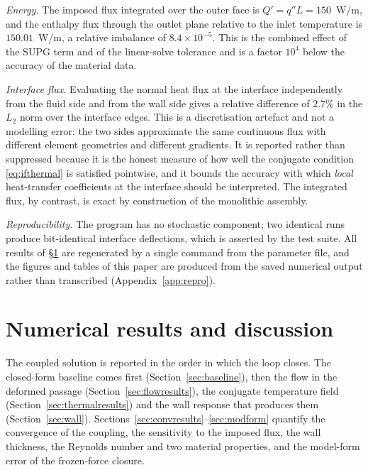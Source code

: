 \documentclass[11pt,a4paper]{article}
\begin{document}
\emph{Energy.} The imposed flux integrated over the outer face is
$Q'=q''L=150$~W/m, and the enthalpy flux through the outlet plane relative to
the inlet temperature is $150.01$~W/m, a relative imbalance of
$8.4\times10^{-5}$. This is the combined effect of the SUPG term and of the
linear-solve tolerance and is a factor $10^{4}$ below the accuracy of the
material data.

\emph{Interface flux.} Evaluating the normal heat flux at the interface
independently from the fluid side and from the wall side gives a relative
difference of $2.7\%$ in the $L_2$ norm over the interface edges. This is a
discretisation artefact and not a modelling error: the two sides approximate
the same continuous flux with different element geometries and different
gradients. It is reported rather than suppressed because it is the honest
measure of how well the conjugate condition \eqref{eq:ifthermal} is satisfied
pointwise, and it bounds the accuracy with which \emph{local} heat-transfer
coefficients at the interface should be interpreted. The integrated flux, by
contrast, is exact by construction of the monolithic assembly.

\emph{Reproducibility.} The program has no stochastic component; two identical
runs produce bit-identical interface deflections, which is asserted by the
test suite. All results of \S\ref{sec:results} are regenerated by a single
command from the parameter file, and the figures and tables of this paper are
produced from the saved numerical output rather than transcribed
(Appendix~\ref{app:repro}).


\section{Numerical results and discussion}
\label{sec:results}

The coupled solution is reported in the order in which the loop closes. The
closed-form baseline comes first (Section~\ref{sec:baseline}), then the flow in
the deformed passage (Section~\ref{sec:flowresults}), the conjugate temperature
field (Section~\ref{sec:thermalresults}) and the wall response that produces
them (Section~\ref{sec:wall}). Sections~\ref{sec:convresults}--\ref{sec:modform}
quantify the convergence of the coupling, the sensitivity to the imposed flux,
the wall thickness, the Reynolds number and two material properties, and the
model-form error of the frozen-force closure.
\end{document}
